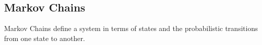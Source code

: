 \subsection{Markov Chains}
\label{subsub:MarkovChains}
Markov Chains define a system in terms of states and the probabilistic transitions from one state to another. 


